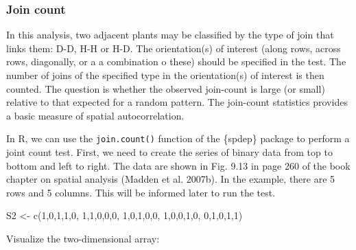 \documentclass[
  letterpaper,
]{book}
\newenvironment{Shaded}{\begin{snugshade}}{\end{snugshade}}
\newcommand{\DecValTok}[1]{\textcolor[rgb]{0.68,0.00,0.00}{#1}}
\newcommand{\FunctionTok}[1]{\textcolor[rgb]{0.28,0.35,0.67}{#1}}
\newcommand{\NormalTok}[1]{\textcolor[rgb]{0.00,0.23,0.31}{#1}}
\newcommand{\OtherTok}[1]{\textcolor[rgb]{0.00,0.23,0.31}{#1}}
\begin{document}
\hypertarget{join-count}{%
\subsubsection{Join count}\label{join-count}}

In this analysis, two adjacent plants may be classified by the type of
join that links them: D-D, H-H or H-D. The orientation(s) of interest
(along rows, across rows, diagonally, or a a combination o these) should
be specified in the test. The number of joins of the specified type in
the orientation(s) of interest is then counted. The question is whether
the observed join-count is large (or small) relative to that expected
for a random pattern. The join-count statistics provides a basic measure
of spatial autocorrelation.

In R, we can use the \texttt{join.count()} function of the \{spdep\}
package to perform a joint count test. First, we need to create the
series of binary data from top to bottom and left to right. The data are
shown in Fig. 9.13 in page 260 of the book chapter on spatial analysis
(Madden et al. 2007b). In the example, there are 5 rows and 5 columns.
This will be informed later to run the test.

\begin{Shaded}
\begin{Highlighting}[]
\NormalTok{S2 }\OtherTok{\textless{}{-}} \FunctionTok{c}\NormalTok{(}\DecValTok{1}\NormalTok{,}\DecValTok{0}\NormalTok{,}\DecValTok{1}\NormalTok{,}\DecValTok{1}\NormalTok{,}\DecValTok{0}\NormalTok{,}
       \DecValTok{1}\NormalTok{,}\DecValTok{1}\NormalTok{,}\DecValTok{0}\NormalTok{,}\DecValTok{0}\NormalTok{,}\DecValTok{0}\NormalTok{,}
       \DecValTok{1}\NormalTok{,}\DecValTok{0}\NormalTok{,}\DecValTok{1}\NormalTok{,}\DecValTok{0}\NormalTok{,}\DecValTok{0}\NormalTok{,}
       \DecValTok{1}\NormalTok{,}\DecValTok{0}\NormalTok{,}\DecValTok{0}\NormalTok{,}\DecValTok{1}\NormalTok{,}\DecValTok{0}\NormalTok{,}
       \DecValTok{0}\NormalTok{,}\DecValTok{1}\NormalTok{,}\DecValTok{0}\NormalTok{,}\DecValTok{1}\NormalTok{,}\DecValTok{1}\NormalTok{)}
\end{Highlighting}
\end{Shaded}

Visualize the two-dimensional array:
\end{document}
